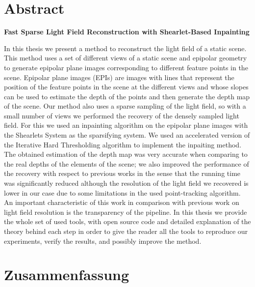 \documentclass[11pt, english, singlespacing, headsepline, ]{MastersDoctoralThesis}
\theoremstyle{definition}
\begin{document}
 

\clearpage\pagestyle{empty}
\section*{Abstract}

\begin{center}
\textbf{Fast Sparse Light Field Reconstruction with Shearlet-Based Inpainting}
\end{center}

In this thesis we present a method to reconstruct the light field of a static scene. This method uses a set of different views of a static scene and epipolar geometry to generate epipolar plane images corresponding to different feature points in the scene. Epipolar plane images (EPIs) are images with lines that represent the position of the feature points in the scene at the different views and whose slopes can be used to estimate the depth of the points and then generate the depth map of the scene. Our method also uses a sparse sampling of the light field, so with a small number of views we performed the recovery of the densely sampled light field. For this we used an inpainting algorithm on the epipolar plane images with the Shearlets System as the sparsifying system. We used an accelerated version of the Iterative Hard Thresholding algorithm to implement the inpaiting method. The obtained estimation of the depth map was very accurate when comparing to the real depths of the elements of the scene; we also improved the performance of the recovery with respect to previous works in the sense that the running time was significantly reduced although the resolution of the light field we recovered is lower in our case due to some limitations in the used point-tracking algorithm. An important characteristic of this work in comparison with previous work on light field resolution is the transparency of the pipeline. In this thesis we provide the whole set of used tools, with open source code and detailed explanation of the theory behind each step in order to give the reader all the tools to reproduce our experiments, verify the results, and possibly improve the method.  

\clearpage\pagestyle{empty}
\section*{Zusammenfassung}
\end{document}
